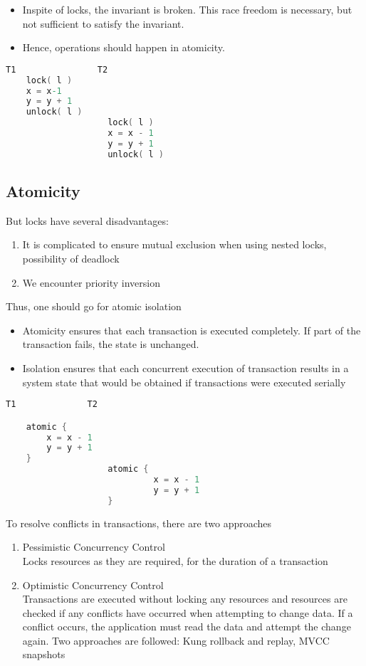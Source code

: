 \documentclass[twoside]{article}
\begin{document}
\begin{itemize}
  \item	Inspite of locks, the invariant is broken. This race freedom is necessary, but not sufficient to satisfy the invariant.
  \item	Hence, operations should happen in atomicity.
\end{itemize}

\begin{lstlisting}[language=C]
	   T1				 T2
	lock( l )
	x = x-1
	y = y + 1
	unlock( l )
					lock( l )
					x = x - 1
					y = y + 1
					unlock( l )


\end{lstlisting}

\subsection{Atomicity}

But locks have several disadvantages:
\begin{enumerate}
  \item	It is complicated to ensure mutual exclusion when using nested locks, possibility of deadlock
  \item	We encounter priority inversion
\end{enumerate}

Thus, one should go for atomic isolation
\begin{itemize}
  \item	Atomicity ensures that each transaction is executed completely. If part of the transaction fails, the state is unchanged.
  \item	Isolation ensures that each concurrent execution of transaction results in a system state that would be obtained if transactions were executed serially
\end{itemize}

\begin{lstlisting}[language=C]
	T1				T2

	atomic {                                                      
	    x = x - 1
	    y = y + 1
	}
					atomic {                                                      
     					     x = x - 1
      		 			     y = y + 1
					}
\end{lstlisting}

To resolve conflicts in transactions, there are two approaches
\begin{enumerate}
  \item	Pessimistic Concurrency Control\\
	Locks resources as they are required, for the duration of a transaction

  \item	Optimistic Concurrency Control\\
   Transactions are executed without locking any resources and resources are checked if any conflicts have occurred when attempting   to change data. If a conflict occurs, the application must read the data and attempt the change again. Two approaches are followed: Kung  rollback and replay, MVCC snapshots

\end{enumerate}
\end{document}
